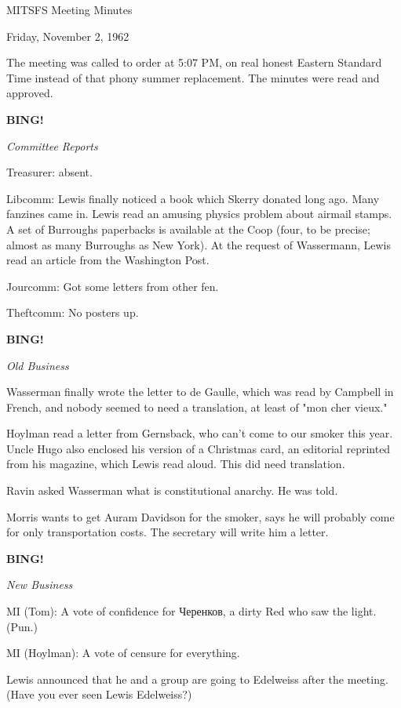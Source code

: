 \documentclass[12pt]{article}
\newcommand{\bing}{{\bf BING!} }
\newcommand{\goto}[1]{\bing \vskip 12pt \centerline{{\em{#1}}}}
\begin{document}
\begin{center}

MITSFS Meeting Minutes

Friday, November 2, 1962

\end{center}
 
\vspace{12pt}

\setlength{\parskip}{6pt}

\noindent
The meeting was called to order at 5:07 PM, on real honest Eastern Standard Time instead of that phony summer replacement. The minutes were read and approved.

\goto{Committee Reports}

Treasurer: absent.

Libcomm: Lewis finally noticed a book which Skerry donated long ago. Many fanzines came in. Lewis read an amusing physics problem about airmail stamps. A set of Burroughs paperbacks is available at the Coop (four, to be precise; almost as many Burroughs as New York). At the request of Wassermann, Lewis read an article from the Washington Post.

Jourcomm: Got some letters from other fen.

Theftcomm: No posters up.

\goto{Old Business}

Wasserman finally wrote the letter to de Gaulle, which was read by Campbell in French, and nobody seemed to need a translation, at least of "mon cher vieux."

Hoylman read a letter from Gernsback, who can't come to our smoker this year. Uncle Hugo also enclosed his version of a Christmas card, an editorial reprinted from his magazine, which Lewis read aloud. This did need translation.

Ravin asked Wasserman what is constitutional anarchy. He was told.

Morris wants to get Auram Davidson for the smoker, says he will probably come for only transportation costs. The secretary will write him a letter.

\goto{New Business}

MI (Tom): A vote of confidence for Черенков, a dirty Red who saw the light. (Pun.)

MI (Hoylman): A vote of censure for everything.

Lewis announced that he and a group are going to Edelweiss after the meeting. (Have you ever seen Lewis Edelweiss?)
\end{document}
